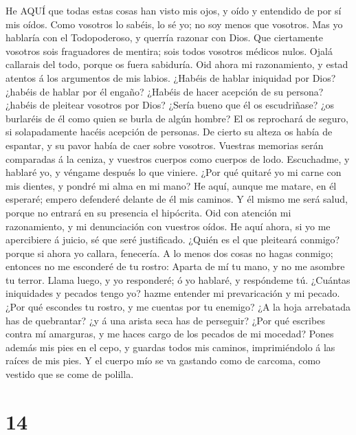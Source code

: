  He AQUÍ que todas estas cosas han visto mis ojos, y oído y
entendido de por sí mis oídos.  Como vosotros lo sabéis, lo
sé yo; no soy menos que vosotros.  Mas yo hablaría con el
Todopoderoso, y querría razonar con Dios.  Que ciertamente
vosotros sois fraguadores de mentira; sois todos vosotros médicos nulos.
 Ojalá callarais del todo, porque os fuera sabiduría.
 Oid ahora mi razonamiento, y estad atentos á los argumentos
de mis labios.  ¿Habéis de hablar iniquidad por Dios?
¿habéis de hablar por él engaño?  ¿Habéis de hacer acepción
de su persona? ¿habéis de pleitear vosotros por Dios? 
¿Sería bueno que él os escudriñase? ¿os burlaréis de él como quien se
burla de algún hombre?  El os reprochará de seguro, si
solapadamente hacéis acepción de personas.  De cierto su
alteza os había de espantar, y su pavor había de caer sobre vosotros.
 Vuestras memorias serán comparadas á la ceniza, y vuestros
cuerpos como cuerpos de lodo.  Escuchadme, y hablaré yo, y
véngame después lo que viniere.  ¿Por qué quitaré yo mi
carne con mis dientes, y pondré mi alma en mi mano?  He
aquí, aunque me matare, en él esperaré; empero defenderé delante de él
mis caminos.  Y él mismo me será salud, porque no entrará
en su presencia el hipócrita.  Oid con atención mi
razonamiento, y mi denunciación con vuestros oídos.  He
aquí ahora, si yo me apercibiere á juicio, sé que seré justificado.
 ¿Quién es el que pleiteará conmigo? porque si ahora yo
callara, fenecería.  A lo menos dos cosas no hagas conmigo;
entonces no me esconderé de tu rostro:  Aparta de mí tu
mano, y no me asombre tu terror.  Llama luego, y yo
responderé; ó yo hablaré, y respóndeme tú.  ¿Cuántas
iniquidades y pecados tengo yo? hazme entender mi prevaricación y mi
pecado.  ¿Por qué escondes tu rostro, y me cuentas por tu
enemigo?  ¿A la hoja arrebatada has de quebrantar? ¿y á una
arista seca has de perseguir?  ¿Por qué escribes contra mí
amarguras, y me haces cargo de los pecados de mi mocedad? 
Pones además mis pies en el cepo, y guardas todos mis caminos,
imprimiéndolo á las raíces de mis pies.  Y el cuerpo mío se
va gastando como de carcoma, como vestido que se come de polilla.

\hypertarget{section-13}{%
\section{14}\label{section-13}}

